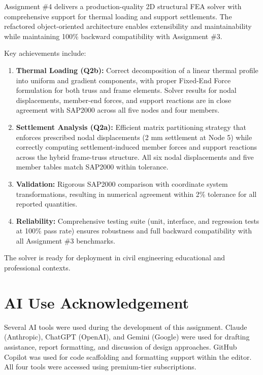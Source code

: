 \documentclass[12pt,a4paper]{article}
\begin{document}
Assignment \#4 delivers a production-quality 2D structural FEA solver with comprehensive support for thermal loading and support settlements. The refactored object-oriented architecture enables extensibility and maintainability while maintaining 100\% backward compatibility with Assignment \#3.

Key achievements include:

\begin{enumerate}
    \item \textbf{Thermal Loading (Q2b):} Correct decomposition of a linear thermal profile into uniform and gradient components, with proper Fixed-End Force formulation for both truss and frame elements. Solver results for nodal displacements, member-end forces, and support reactions are in close agreement with SAP2000 across all five nodes and four members.
    \item \textbf{Settlement Analysis (Q2a):} Efficient matrix partitioning strategy that enforces prescribed nodal displacements (2 mm settlement at Node 5) while correctly computing settlement-induced member forces and support reactions across the hybrid frame-truss structure. All six nodal displacements and five member tables match SAP2000 within tolerance.
    \item \textbf{Validation:} Rigorous SAP2000 comparison with coordinate system transformations, resulting in numerical agreement within 2\% tolerance for all reported quantities.
    \item \textbf{Reliability:} Comprehensive testing suite (unit, interface, and regression tests at 100\% pass rate) ensures robustness and full backward compatibility with all Assignment \#3 benchmarks.
\end{enumerate}

The solver is ready for deployment in civil engineering educational and professional contexts.


\section{AI Use Acknowledgement}

Several AI tools were used during the development of this assignment. Claude (Anthropic), ChatGPT (OpenAI), and Gemini (Google) were used for drafting assistance, report formatting, and discussion of design approaches. GitHub Copilot was used for code scaffolding and formatting support within the editor. All four tools were accessed using premium-tier subscriptions.
\end{document}
